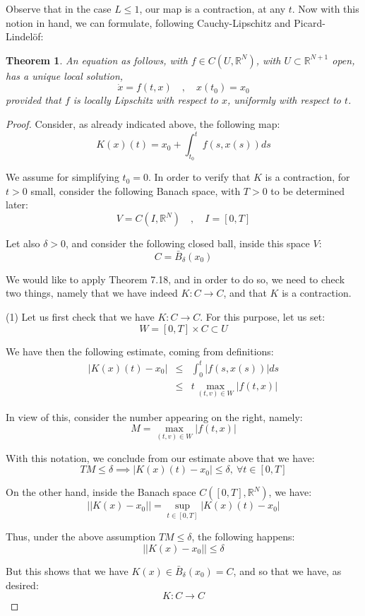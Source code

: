 \documentclass[12pt]{amsbook}
\newtheorem{theorem}{Theorem}[chapter]
\begin{document}
Observe that in the case $L\leq 1$, our map is a contraction, at any $t$. Now with this notion in hand, we can formulate, following Cauchy-Lipschitz and Picard-Lindel\"of:

\begin{theorem}
An equation as follows, with $f\in C(U,\mathbb R^N)$, with $U\subset\mathbb R^{N+1}$ open, has a unique local solution, 
$$\dot{x}=f(t,x)\quad,\quad x(t_0)=x_0$$
provided that $f$ is locally Lipschitz with respect to $x$, uniformly with respect to $t$.
\end{theorem}

\begin{proof}
Consider, as already indicated above, the following map:
$$K(x)(t)=x_0+\int_{t_0}^tf(s,x(s))ds$$

We assume for simplifying $t_0=0$. In order to verify that $K$ is a contraction, for $t>0$ small, consider the following Banach space, with $T>0$ to be determined later:
$$V=C(I,\mathbb R^N)\quad,\quad I=[0,T]$$

Let also $\delta>0$, and consider the following closed ball, inside this space $V$:
$$C=\bar{B}_\delta(x_0)$$

We would like to apply Theorem 7.18, and in order to do so, we need to check two things, namely that we have indeed $K:C\to C$, and that $K$ is a contraction.

\medskip

(1) Let us first check that we have $K:C\to C$. For this purpose, let us set:
$$W=[0,T]\times C\subset U$$

We have then the following estimate, coming from definitions:
\begin{eqnarray*}
|K(x)(t)-x_0|
&\leq&\int_0^t|f(s,x(s))|ds\\
&\leq&t\max_{(t,v)\in W}|f(t,x)|
\end{eqnarray*}

In view of this, consider the number appearing on the right, namely:
$$M=\max_{(t,v)\in W}|f(t,x)|$$

With this notation, we conclude from our estimate above that we have:
$$TM\leq\delta\implies |K(x)(t)-x_0|\leq\delta,\ \forall t\in[0,T]$$

On the other hand, inside the Banach space $C([0,T],\mathbb R^N)$, we have:
$$||K(x)-x_0||=\sup_{t\in[0,T]}|K(x)(t)-x_0|$$

Thus, under the above assumption $TM\leq\delta$, the following happens:
$$||K(x)-x_0||\leq\delta$$

But this shows that we have $K(x)\in \bar{B}_\delta(x_0)=C$, and so that we have, as desired:
$$K:C\to C$$


\end{proof}
\end{document}
